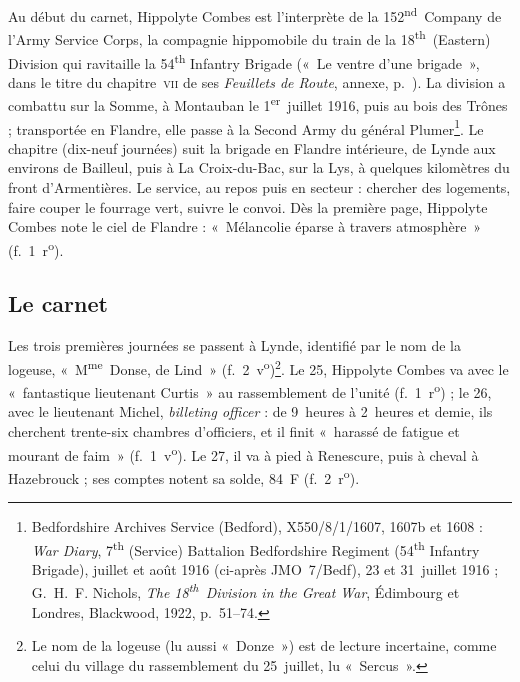 
Au début du carnet, Hippolyte Combes est l'interprète de la 152\textsuperscript{nd}~Company de l'Army Service Corps, la compagnie hippomobile du train de la 18\textsuperscript{th}~(Eastern) Division qui ravitaille la 54\textsuperscript{th} Infantry Brigade («~Le ventre d'une brigade~», dans le titre du chapitre~\textsc{vii} de ses \textit{Feuillets de Route}, annexe, p.~\pageref{annexe:doc6-vii}). La division a combattu sur la Somme, à Montauban le 1\textsuperscript{er}~juillet 1916, puis au bois des Trônes ; transportée en Flandre, elle passe à la Second Army du général Plumer\footnote{Bedfordshire Archives Service (Bedford), X550/8/1/1607, 1607b et 1608 : \textit{War Diary}, 7\textsuperscript{th} (Service) Battalion Bedfordshire Regiment (54\textsuperscript{th} Infantry Brigade), juillet et août 1916 (ci-après JMO~7/Bedf), 23 et 31~juillet 1916 ; G.~H.~F. Nichols, \textit{The 18\textsuperscript{th}~Division in the Great War}, Édimbourg et Londres, Blackwood, 1922, p.~51--74.}. Le chapitre (dix-neuf journées) suit la brigade en Flandre intérieure, de Lynde aux environs de Bailleul, puis à La Croix-du-Bac, sur la Lys, à quelques kilomètres du front d'Armentières. Le service, au repos puis en secteur : chercher des logements, faire couper le fourrage vert, suivre le convoi. Dès la première page, Hippolyte Combes note le ciel de Flandre : «~Mélancolie éparse à travers atmosphère~» (f.~1~r\textsuperscript{o}).

\subsection*{Le carnet}

Les trois premières journées se passent à Lynde, identifié par le nom de la logeuse, «~M\textsuperscript{me}~Donse, de Lind~» (f.~2~v\textsuperscript{o})\footnote{Le nom de la logeuse (lu aussi «~Donze~») est de lecture incertaine, comme celui du village du rassemblement du 25~juillet, lu «~Sercus~».}. Le 25, Hippolyte Combes va avec le «~fantastique lieutenant Curtis~» au rassemblement de l'unité (f.~1~r\textsuperscript{o}) ; le 26, avec le lieutenant Michel, \textit{billeting officer} : de 9~heures à 2~heures et demie, ils cherchent trente-six chambres d'officiers, et il finit «~harassé de fatigue et mourant de faim~» (f.~1~v\textsuperscript{o}). Le 27, il va à pied à Renescure, puis à cheval à Hazebrouck ; ses comptes notent sa solde, 84~F (f.~2~r\textsuperscript{o}).

